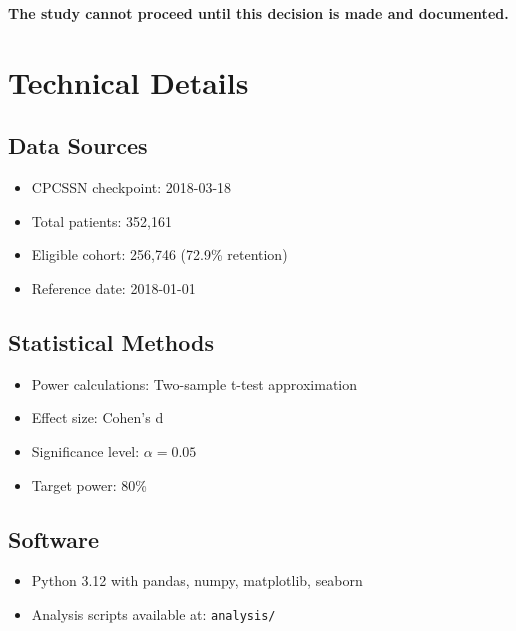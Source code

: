 \documentclass[11pt]{article}
\begin{document}
\textcolor{alertred}{\textbf{The study cannot proceed until this decision is made and documented.}}

\appendix

\section{Technical Details}

\subsection{Data Sources}
\begin{itemize}
    \item CPCSSN checkpoint: 2018-03-18
    \item Total patients: 352,161
    \item Eligible cohort: 256,746 (72.9\% retention)
    \item Reference date: 2018-01-01
\end{itemize}

\subsection{Statistical Methods}
\begin{itemize}
    \item Power calculations: Two-sample t-test approximation
    \item Effect size: Cohen's d
    \item Significance level: $\alpha = 0.05$
    \item Target power: 80\%
\end{itemize}

\subsection{Software}
\begin{itemize}
    \item Python 3.12 with pandas, numpy, matplotlib, seaborn
    \item Analysis scripts available at: \texttt{analysis/}
\end{itemize}
\end{document}
